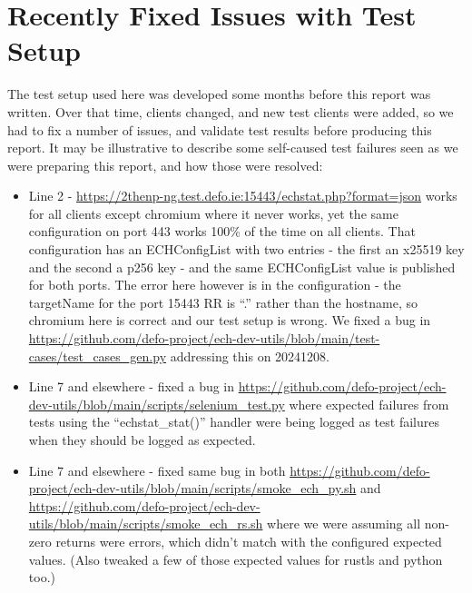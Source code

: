 \section{Recently Fixed Issues with Test Setup}
\label{app:alongtheway}

The test setup used here was developed some months before this report was
written.  Over that time, clients changed, and new test clients were added, so
we had to fix a number of issues, and validate test results before producing
this report. It may be illustrative to describe some self-caused test failures
seen as we were preparing this report, and how those were resolved:

\begin{itemize}

\item Line 2 -
    \url{https://2thenp-ng.test.defo.ie:15443/echstat.php?format=json} works
        for all clients except chromium where it never works, yet the same
        configuration on port 443 works 100\% of the time on all clients. That
        configuration has an ECHConfigList with two entries - the first an
        x25519 key and the second a p256 key - and the same ECHConfigList value
        is published for both ports. The error here however is in the
        configuration - the targetName for the port 15443 RR is ``.'' rather
        than the hostname, so chromium here is correct and our test setup is
        wrong. We fixed a bug in
        \url{https://github.com/defo-project/ech-dev-utils/blob/main/test-cases/test_cases_gen.py}
        addressing this on 20241208.\\

    \item Line 7 and elsewhere - fixed a bug in
        \url{https://github.com/defo-project/ech-dev-utils/blob/main/scripts/selenium_test.py}
        where expected failures from tests using the ``echstat\_stat()''
        handler were being logged as test failures when they should be logged
        as expected.

    \item Line 7 and elsewhere - fixed same bug in both
        \url{https://github.com/defo-project/ech-dev-utils/blob/main/scripts/smoke_ech_py.sh}
        and
        \url{https://github.com/defo-project/ech-dev-utils/blob/main/scripts/smoke_ech_rs.sh}
        where we were assuming all non-zero returns were errors, which didn't match with
        the configured expected values. (Also tweaked a few of those expected values for
        rustls and python too.)


\end{itemize}
